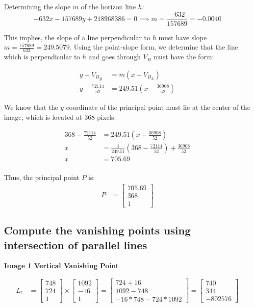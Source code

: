 \documentclass[12pt, oneside]{article}
\begin{document}
Determining the slope $m$ of the horizon line $h$: 
$$  -632x  -157689y +  218968386 = 0  \implies m = \frac{-632}{157689} = -0.0040$$

This implies, the slope of a line perpendicular to $h$ must have slope $m = 
\frac{157689}{632} = 249.5079$. Using the point-slope form, we determine that the line 
which is perpendicular to $h$ and goes through $V_B$ must have the form:

\begin{align*}
    y - {V_B}_y &= m (x - {V_B}_x)  \\
    y - \frac{72114}{52} &= 249.51 (x - \frac{36908}{52}) 
\end{align*}

We know that the $y$ coordinate of the principal point must lie at the center 
of the image, which is located at $368$ pixels.

\begin{align*}
    368 - \frac{72114}{52} &= 249.51 (x - \frac{36908}{52})  \\
    x &=  \frac{1}{ 249.51}( 368 - \frac{72114}{52}) + \frac{36908}{52}  \\
    x &=  705.69 \\
\end{align*}

Thus, the principal point $P$ is:
\begin{align*}
    P &= \begin{bmatrix} 705.69 \\ 368 \\1 \end{bmatrix} 
\end{align*}

\subsection{Compute the vanishing points using intersection of parallel lines}

\textbf{Image 1 Vertical Vanishing Point}

\begin{align*}
L_1 &=    \begin{bmatrix}
            748 \\
            724 \\
            1
        \end{bmatrix} \times 
        \begin{bmatrix}
            1092 \\
            -16 \\
            1
        \end{bmatrix}  = 
        \begin{bmatrix}
            724 + 16 \\
            1092 - 748 \\
            -16*748 - 724*1092
        \end{bmatrix} = 
        \begin{bmatrix}
            740  \\
            344 \\
            -802576 
        \end{bmatrix}                                                   
\end{align*}
\end{document}
